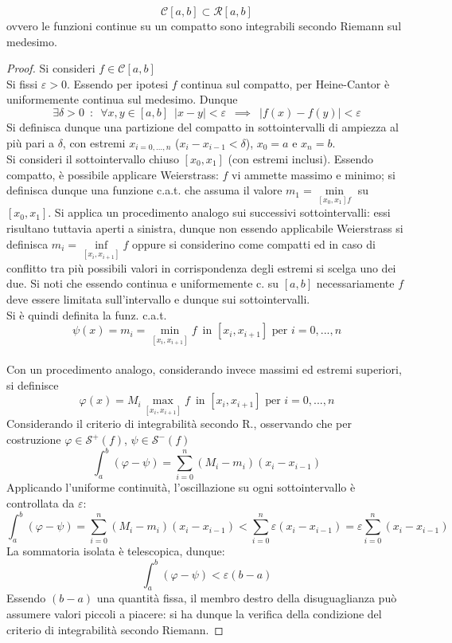 \documentclass[10pt]{article}
\theoremstyle{plain}
\begin{document}
\begin{ther}
    \[\mathcal{C}[a,b] \subset \mathcal{R}[a,b]\]
    ovvero le funzioni continue su un compatto sono integrabili secondo Riemann sul medesimo.
\end{ther}
\begin{proof}
    Si consideri $f \in \mathcal{C}[a,b]$
    \\Si fissi $\varepsilon > 0$. Essendo per ipotesi $f$ continua sul compatto, per Heine-Cantor è uniformemente continua sul medesimo. Dunque
    \[\exists \delta > 0 \enspace : \enspace \forall x,y \in [a,b] \enspace |x-y| < \varepsilon \enspace \implies \enspace |f(x) - f(y)| < \varepsilon\]
    Si definisca dunque una partizione del compatto in sottointervalli di ampiezza al più pari a $\delta$, con estremi $x_{i = 0, ..., n}$ ($x_i - x_{i-1} < \delta$), $x_0 = a$ e $x_n = b$.
    \\Si consideri il sottointervallo chiuso $[x_0, x_1]$ (con estremi inclusi). Essendo compatto, è possibile applicare Weierstrass: $f$ vi ammette massimo e minimo; si definisca dunque una funzione c.a.t. che assuma il valore $m_1 = \min\limits_{[x_0, x_1] f}$ su $[x_0, x_1]$. Si applica un procedimento analogo sui successivi sottointervalli: essi risultano tuttavia aperti a sinistra, dunque non essendo applicabile Weierstrass si definisca $m_i = \inf\limits_{[x_i, x_{i+1}]} f$ oppure si considerino come compatti ed in caso di conflitto tra più possibili valori in corrispondenza degli estremi si scelga uno dei due. Si noti che essendo continua e uniformemente c. su $[a,b]$ necessariamente $f$ deve essere limitata sull'intervallo e dunque sui sottointervalli.
    \\Si è quindi definita la funz. c.a.t.
    \[\psi(x) = m_i = \min \limits_{[x_i, x_{i+1}]} f \enspace \textrm{in $[x_i, x_{i+1}]$ per $i = 0, ..., n$}\]
    \\Con un procedimento analogo, considerando invece massimi ed estremi superiori, si definisce 
    \[\varphi(x) = M_i \max \limits_{[x_i, x_{i+1}]} f \enspace \textrm{in $[x_i, x_{i+1}]$ per $i = 0, ..., n$}\]
    Considerando il criterio di integrabilità secondo R., osservando che per costruzione $\varphi \in \mathcal{S}^+(f)$, $\psi \in \mathcal{S}^-(f)$
    \[\int_a^b (\varphi - \psi) = \sum\limits_{i=0}^n (M_i - m_i) (x_i - x_{i-1})\]
    Applicando l'uniforme continuità, l'oscillazione su ogni sottointervallo è controllata da $\varepsilon$:
    \[\int_a^b (\varphi - \psi) = \sum\limits_{i=0}^n (M_i - m_i) (x_i - x_{i-1}) < \sum\limits_{i=0}^n \varepsilon (x_i - x_{i-1}) = \varepsilon \sum\limits_{i=0}^n (x_i - x_{i-1})\]
    La sommatoria isolata è telescopica, dunque:
    \[\int_a^b (\varphi - \psi) < \varepsilon (b - a)\]
    Essendo $(b - a)$ una quantità fissa, il membro destro della disuguaglianza può assumere valori piccoli a piacere: si ha dunque la verifica della condizione del criterio di integrabilità secondo Riemann.
\end{proof}
\end{document}
